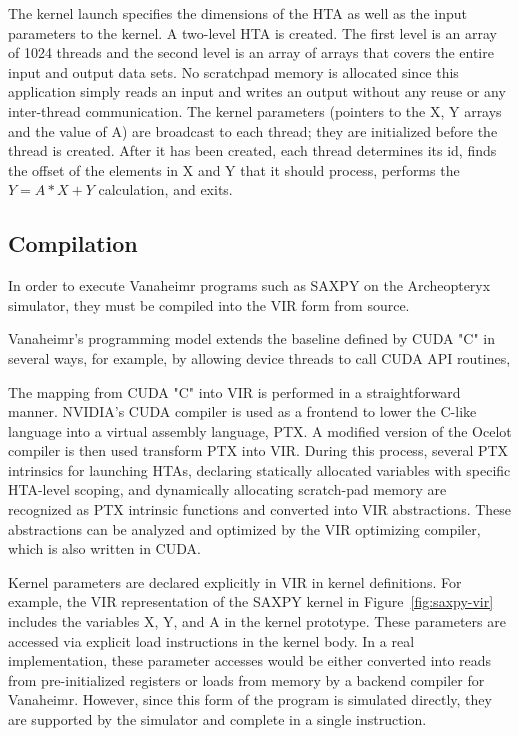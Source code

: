 \documentclass[conference, 10pt]{IEEEtran}
\begin{document}
The kernel launch specifies the dimensions of the HTA as well as the input
parameters to the kernel.  A two-level HTA is created.  The first level is an
array of 1024 threads and the second level is an array of arrays that covers
the entire input and output data sets.  No scratchpad memory is allocated since
this application simply reads an input and writes an output without any reuse
or any inter-thread communication.  The kernel parameters (pointers to the X, Y
arrays and the value of A) are broadcast to each thread; they are initialized
before the thread is created.  After it has been created, each thread determines
its id, finds the offset of the elements in X and Y that it should process,
performs the $Y = A*X+Y$ calculation, and exits.

\subsection{Compilation}

In order to execute Vanaheimr programs such as SAXPY on the Archeopteryx
simulator, they must be compiled into the VIR form from source.  

Vanaheimr's programming model extends the baseline defined by CUDA "C" in
several ways, for example, by allowing device threads to call CUDA API routines,





The mapping from CUDA "C" into VIR is performed in a straightforward manner.
NVIDIA's CUDA compiler is used as a frontend to lower the C-like language into
a virtual assembly language, PTX.  A modified version of the Ocelot compiler is
then used transform PTX into VIR.  During this process, several PTX intrinsics
for launching HTAs, declaring statically allocated variables with specific
HTA-level scoping, and dynamically allocating scratch-pad memory are recognized
as PTX intrinsic functions and converted into VIR abstractions.  These
abstractions can be analyzed and optimized by the VIR optimizing compiler, which
is also written in CUDA.

Kernel parameters are declared explicitly in VIR in kernel definitions. 
For example, the VIR representation of the SAXPY kernel in 
Figure~\ref{fig:saxpy-vir} includes the variables X, Y, and A in the kernel
prototype.  These parameters are accessed via explicit load
instructions in the kernel body. In a real implementation, these parameter
accesses would be either converted into reads from pre-initialized registers or
loads from memory by a backend compiler for Vanaheimr.  However, since this
form of the program is simulated directly, they are supported by the simulator
and complete in a single instruction.
\end{document}
